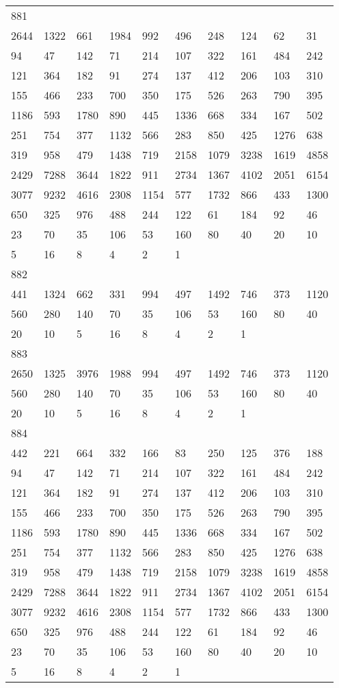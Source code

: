 \begin{longtable}{*{10}{l}}
881&&&&&&&&&\\
2644& 1322& 661& 1984& 992& 496& 248& 124& 62& 31\\
94& 47& 142& 71& 214& 107& 322& 161& 484& 242\\
121& 364& 182& 91& 274& 137& 412& 206& 103& 310\\
155& 466& 233& 700& 350& 175& 526& 263& 790& 395\\
1186& 593& 1780& 890& 445& 1336& 668& 334& 167& 502\\
251& 754& 377& 1132& 566& 283& 850& 425& 1276& 638\\
319& 958& 479& 1438& 719& 2158& 1079& 3238& 1619& 4858\\
2429& 7288& 3644& 1822& 911& 2734& 1367& 4102& 2051& 6154\\
3077& 9232& 4616& 2308& 1154& 577& 1732& 866& 433& 1300\\
650& 325& 976& 488& 244& 122& 61& 184& 92& 46\\
23& 70& 35& 106& 53& 160& 80& 40& 20& 10\\
5& 16& 8& 4& 2& 1& \\

882&&&&&&&&&\\
441& 1324& 662& 331& 994& 497& 1492& 746& 373& 1120\\
560& 280& 140& 70& 35& 106& 53& 160& 80& 40\\
20& 10& 5& 16& 8& 4& 2& 1& \\

883&&&&&&&&&\\
2650& 1325& 3976& 1988& 994& 497& 1492& 746& 373& 1120\\
560& 280& 140& 70& 35& 106& 53& 160& 80& 40\\
20& 10& 5& 16& 8& 4& 2& 1& \\

884&&&&&&&&&\\
442& 221& 664& 332& 166& 83& 250& 125& 376& 188\\
94& 47& 142& 71& 214& 107& 322& 161& 484& 242\\
121& 364& 182& 91& 274& 137& 412& 206& 103& 310\\
155& 466& 233& 700& 350& 175& 526& 263& 790& 395\\
1186& 593& 1780& 890& 445& 1336& 668& 334& 167& 502\\
251& 754& 377& 1132& 566& 283& 850& 425& 1276& 638\\
319& 958& 479& 1438& 719& 2158& 1079& 3238& 1619& 4858\\
2429& 7288& 3644& 1822& 911& 2734& 1367& 4102& 2051& 6154\\
3077& 9232& 4616& 2308& 1154& 577& 1732& 866& 433& 1300\\
650& 325& 976& 488& 244& 122& 61& 184& 92& 46\\
23& 70& 35& 106& 53& 160& 80& 40& 20& 10\\
5& 16& 8& 4& 2& 1& \\


\end{longtable}
